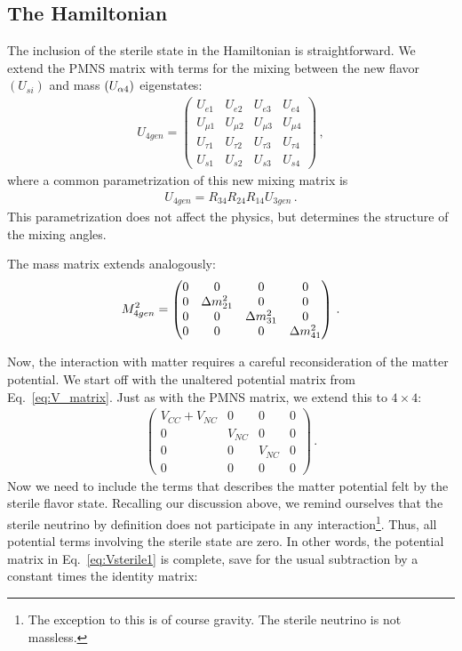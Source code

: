 \subsection{The Hamiltonian}
The inclusion of the sterile state in the Hamiltonian is straightforward. We extend the PMNS matrix
with terms for the mixing between the new flavor $(U_{si})$ and mass $(U_{\alpha 4})$ eigenstates:
\begin{align}
    U_{4gen} =
    \begin{pmatrix}
    U_{e1} & U_{e2} & U_{e3} & U_{e4} \\
    U_{\mu1} & U_{\mu2} & U_{\mu3} & U_{\mu4} \\
    U_{\tau1} & U_{\tau2} & U_{\tau3} & U_{\tau4} \\
    U_{s1} & U_{s2} & U_{s3} & U_{s4}
    \end{pmatrix}\,,
\end{align}
where a common parametrization of this new mixing matrix is 
\begin{align}\label{eq:U4gen_param}
    U_{4gen} = R_{34}R_{24}R_{14}U_{3gen}\,.
\end{align}
This parametrization does not affect the physics, but determines the structure of the mixing angles.

The mass matrix extends analogously:
\begin{align}\label{eq:dm4gen}
    M^2_{4gen} =
    \begin{pmatrix}
        0 & 0 & 0 & 0\\
        0 & \dm_{21} & 0  & 0 \\
        0 & 0 & \dm_{31} & 0 \\
        0 & 0 & 0 & \dm_{41} \\
    \end{pmatrix}\,.
\end{align}

Now, the interaction with matter requires a careful reconsideration of the matter potential. We start off with the unaltered potential matrix from Eq.~\ref{eq:V_matrix}. 
Just as with the PMNS matrix, we extend this to $4\times4$:
\begin{align}\label{eq:Vsterile1}
    \begin{pmatrix}
        V_{CC} + V_{NC} & 0 & 0 & 0 \\
        0 &V_{NC} & 0 & 0 \\
        0 & 0 & V_{NC} & 0 \\
        0 & 0 & 0 & 0 
    \end{pmatrix}\,.
\end{align}
Now we need to include the terms that describes the matter potential felt by the sterile flavor state. Recalling our discussion above, we remind ourselves that the sterile neutrino by definition
does not participate in any interaction\footnote{The exception to this is of course gravity. The sterile neutrino is not massless.}. Thus, all potential terms involving the sterile state are zero. 
In other words, the potential matrix in Eq.~\ref{eq:Vsterile1} is complete, save for the usual subtraction by a constant times the identity matrix:


